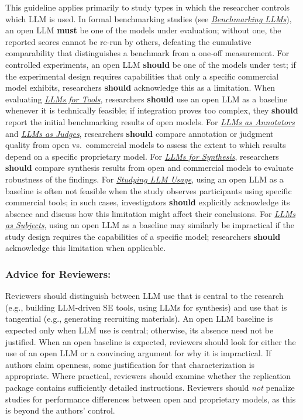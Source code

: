 \documentclass[smallextended]{svjour3}
\newcommand{\must}{\textbf{must}\xspace}
\newcommand{\should}{\textbf{should}\xspace}
\newcommand{\annotators}{\hyperref[sec:llms-as-annotators]{\emph{LLMs as Annotators}}\xspace}
\newcommand{\judges}{\hyperref[sec:llms-as-judges]{\emph{LLMs as Judges}}\xspace}
\newcommand{\synthesis}{\hyperref[sec:llms-for-synthesis]{\emph{LLMs for Synthesis}}\xspace}
\newcommand{\subjects}{\hyperref[sec:llms-as-subjects]{\emph{LLMs as Subjects}}\xspace}
\newcommand{\llmusage}{\hyperref[sec:studying-llm-usage-in-software-engineering]{\emph{Studying LLM Usage}}\xspace}
\newcommand{\newtools}{\hyperref[sec:llms-for-new-software-engineering-tools]{\emph{LLMs for Tools}}\xspace}
\newcommand{\benchmarkingtasks}{\hyperref[sec:benchmarking-llms-for-software-engineering-tasks]{\emph{Benchmarking LLMs}}\xspace}
\newcommand{\annotators}{\href{/study-types\#llms-as-annotators}{\emph{LLMs as Annotators}}\xspace}
\newcommand{\judges}{\href{/study-types\#llms-as-judges}{\emph{LLMs as Judges}}\xspace}
\newcommand{\synthesis}{\href{/study-types\#llms-for-synthesis}{\emph{LLMs for Synthesis}}\xspace}
\newcommand{\subjects}{\href{/study-types\#llms-as-subjects}{\emph{LLMs as Subjects}}\xspace}
\newcommand{\llmusage}{\href{/study-types\#studying-llm-usage-in-software-engineering}{\emph{Studying LLM Usage}}\xspace}
\newcommand{\newtools}{\href{/study-types\#llms-for-new-software-engineering-tools}{\emph{LLMs for Tools}}\xspace}
\newcommand{\benchmarkingtasks}{\href{/study-types\#benchmarking-llms-for-software-engineering-tasks}{\emph{Benchmarking LLMs}}\xspace}
\newcommand{\guidelinesubsubsection}[1]{\subsubsection{\bfseries #1:}}
\newcommand{\guidelinesubsubsection}[1]{\subsubsection{#1}}
\begin{document}
This guideline applies primarily to study types in which the researcher controls which LLM is used.
In formal benchmarking studies (see \benchmarkingtasks), an open LLM \must be one of the models under evaluation; without one, the reported scores cannot be re-run by others, defeating the cumulative comparability that distinguishes a benchmark from a one-off measurement.
For controlled experiments, an open LLM \should be one of the models under test; if the experimental design requires capabilities that only a specific commercial model exhibits, researchers \should acknowledge this as a limitation.
When evaluating \newtools, researchers \should use an open LLM as a baseline whenever it is technically feasible; if integration proves too complex, they \should report the initial benchmarking results of open models.
For \annotators and \judges, researchers \should compare annotation or judgment quality from open vs.\ commercial models to assess the extent to which results depend on a specific proprietary model.
For \synthesis, researchers \should compare synthesis results from open and commercial models to evaluate robustness of the findings.
For \llmusage, using an open LLM as a baseline is often not feasible when the study observes participants using specific commercial tools; in such cases, investigators \should explicitly acknowledge its absence and discuss how this limitation might affect their conclusions.
For \subjects, using an open LLM as a baseline may similarly be impractical if the study design requires the capabilities of a specific model; researchers \should acknowledge this limitation when applicable.

\guidelinesubsubsection{Advice for Reviewers}

Reviewers should distinguish between LLM use that is central to the research (e.g., building LLM-driven SE tools, using LLMs for synthesis) and use that is tangential (e.g., generating recruiting materials). An open LLM baseline is expected only when LLM use is central; otherwise, its absence need not be justified.
When an open baseline is expected, reviewers should look for either the use of an open LLM or a convincing argument for why it is impractical. If authors claim openness, some justification for that characterization is appropriate. Where practical, reviewers should examine whether the replication package contains sufficiently detailed instructions.
Reviewers should \textit{not} penalize studies for performance differences between open and proprietary models, as this is beyond the authors' control.
\end{document}
